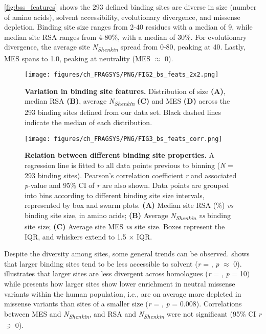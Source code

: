 \autoref{fig:bss_features} shows the 293 defined binding sites are diverse in size (number of amino acids), solvent accessibility, evolutionary divergence, and missense depletion. Binding site size ranges from 2-40 residues with a median of 9, while median site RSA ranges from 4-80\%, with a median of 30\%. For evolutionary divergence, the average site \textit{N\textsubscript{Shenkin}} spread from 0-80, peaking at 40. Lastly, MES spans  to 1.0, peaking at neutrality (MES $\approx$ 0).

\begin{figure}[htb!]
    \centering
    \texttt{[image: figures/ch\_FRAGSYS/PNG/FIG2\_bs\_feats\_2x2.png]}
    \caption[Variation in binding site features]{\textbf{Variation in binding site features.} Distribution of size \textbf{(A)}, median RSA \textbf{(B)}, average \textit{N\textsubscript{Shenkin}} \textbf{(C)} and MES \textbf{(D)} across the 293 binding sites defined from our data set. Black dashed lines indicate the median of each distribution.}
    \label{fig:bss_features}
\end{figure}

\begin{figure}[htb!]
    \centering
    \texttt{[image: figures/ch\_FRAGSYS/PNG/FIG3\_bs\_feats\_corr.png]}
    \caption[Relation between different binding site properties]{\textbf{Relation between different binding site properties.} A regression line is fitted to all data points previous to binning (\textit{N} = 293 binding sites). Pearson’s correlation coefficient \textit{r} \cite{RODGERS_1988_CORRELATION} and associated \textit{p}-value and 95\% CI of \textit{r} \cite{BOWLEY_1928_R_CI} are also shown. Data points are grouped into bins according to different binding site size intervals, represented by box and swarm plots. \textbf{(A)} Median site RSA (\%) \textit{vs} binding site size, in amino acids; \textbf{(B)} Average \textit{N\textsubscript{Shenkin}} \textit{vs} binding site size; \textbf{(C)} Average site MES \textit{vs} site size. Boxes represent the IQR, and whiskers extend to 1.5 $\times$ IQR.}
    \label{fig:bss_feats_corr}
\end{figure}

Despite the diversity among sites, some general trends can be observed.  shows that larger binding sites tend to be less accessible to solvent (\textit{r} = , \textit{p} $\approx$ 0).  illustrates that larger sites are less divergent across homologues (\textit{r} = , \textit{p} = 10\textsuperscript{}) while  presents how larger sites show lower enrichment in neutral missense variants within the human population, i.e., are on average more depleted in missense variants than sites of a smaller size (\textit{r} = , \textit{p} = 0.008). Correlations between MES and \textit{N\textsubscript{Shenkin}}, and RSA and \textit{N\textsubscript{Shenkin}} were not significant (95\% CI \textit{r} $\ni$ 0).

